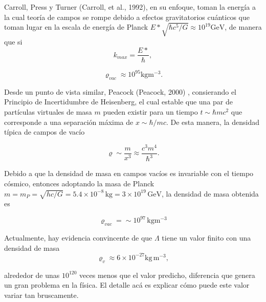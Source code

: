 \documentclass[11pt]{article}
\begin{document}
    
    Carroll, Press y Turner (Carroll, et al., 1992), en su enfoque, toman la energía a la cual teoría de campos se rompe debido a efectos gravitatorios cuánticos que toman lugar en la escala de energía de Planck $E*\sqrt{\hbar c^5/G}  \approx 10^{19} \mathrm{GeV}$, de manera que si
    $$k_{max} = \frac{E*}{\hbar},$$
    
    \begin{equation}
        \varrho_{vac} \approx 10^{95} \mathrm{kg m^{-3}}.
    \end{equation}
    
    
    Desde un punto de vista similar, Peacock (Peacock, 2000) , consierando el Principio de Incertidumbre de Heisenberg, el cual estable que una par de partículas virtuales de masa $m$ pueden existir para un tiempo $t \sim \hbar mc^2$ que corresponde a una separación máxima de $x \sim \hbar/mc$. De esta manera, la densidad típica de campos de vacío 

    \begin{equation}
	    \varrho \sim \frac{m}{x^3} \approx \frac{c^3m^4}{\hbar^3}.
    \end{equation}
    
    Debido a que la densidad de masa en campos vacíos es invariable con el tiempo cósmico, entonces adoptando la masa de Planck $m = m_P = \sqrt{hc/G} = 5.4 \times 10^{-8} \, \mathrm{kg} = 3 \times 10^{19} \, \mathrm{GeV}$, la densidad de masa obtenida es

    \begin{equation}
        \varrho_{vac} = \sim 10^{97} \, \mathrm{kg m^{-3}}
    \end{equation} 
    
    Actualmente, hay evidencia convincente de que $\Lambda$ tiene un valor finito con una densidad de masa 
    \begin{equation}
        \varrho_v \approx 6 \times 10^{-27} \mathrm{kg \, m^{-3}},
    \end{equation} 

    alrededor de unas $10^{120}$ veces menos que el valor predicho, diferencia que genera un gran problema en la física. El detalle acá es explicar cómo puede este valor variar tan bruscamente. 
    
\end{document}

